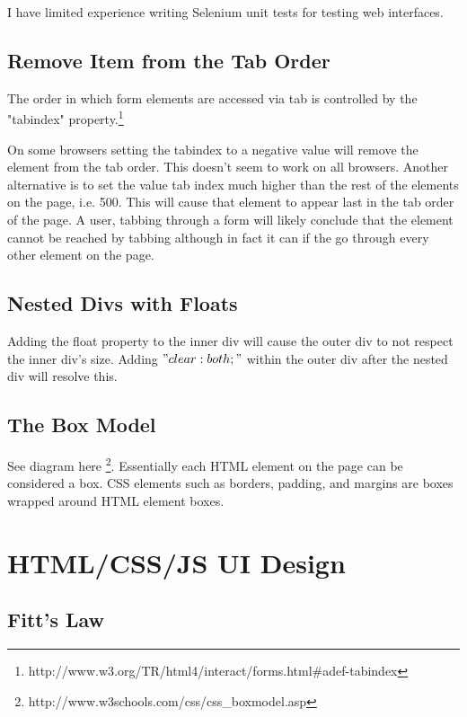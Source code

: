 \documentclass[12pt]{amsart}
\begin{document}
I have limited experience writing Selenium unit tests for testing web interfaces.

\subsection{Remove Item from the Tab Order}

The order in which form elements are accessed via tab is controlled by the "tabindex" property.\footnote[1]{http://www.w3.org/TR/html4/interact/forms.html\#adef-tabindex}

On some browsers setting the tabindex to a negative value will remove the element from the tab order. This doesn't seem to work on all browsers. Another alternative is to set the value tab index much higher than the rest of the elements on the page, i.e. 500. This will cause that element to appear last in the tab order of the page. A user, tabbing through a form will likely conclude that the element cannot be reached by tabbing although in fact it can if the go through every other element on the page.

\subsection{Nested Divs with Floats}

Adding the float property to the inner div will cause the outer div to not respect the inner div's size. Adding $"clear:both;"$ within the outer div after the nested div will resolve this.


\subsection{The Box Model}

See diagram here \footnote[2]{http://www.w3schools.com/css/css_boxmodel.asp}. Essentially each HTML element on the page can be considered a box. CSS elements such as borders, padding, and margins are boxes wrapped around HTML element boxes.



\section{HTML/CSS/JS UI Design}

\subsection{Fitt's Law}
\end{document}
